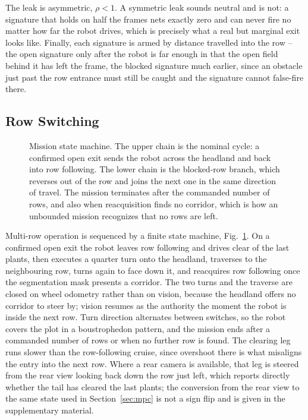 \documentclass[conference]{IEEEtran}
\begin{document}
The leak is asymmetric, $\rho < 1$. A symmetric leak sounds neutral and is not:
a signature that holds on half the frames nets exactly zero and can never fire
no matter how far the robot drives, which is precisely what a real but marginal
exit looks like. Finally, each signature is armed by distance travelled into
the row -- the open signature only after the robot is far enough in that the
open field behind it has left the frame, the blocked signature much earlier,
since an obstacle just past the row entrance must still be caught and the
signature cannot false-fire there.

\subsection{Row Switching}
\label{sec:switching}

\begin{figure}[t]
\centering

\caption{Mission state machine. The upper chain is the nominal cycle: a
confirmed open exit sends the robot across the headland and back into row
following. The lower chain is the blocked-row branch, which reverses out of the
row and joins the next one in the same direction of travel. The mission
terminates after the commanded number of rows, and also when reacquisition
finds no corridor, which is how an unbounded mission recognizes that no rows
are left.}
\label{fig:fsm}
\end{figure}

Multi-row operation is sequenced by a finite state machine, Fig.~\ref{fig:fsm}.
On a confirmed open
exit the robot leaves row following and drives clear of the last plants, then
executes a quarter turn onto the headland, traverses to the neighbouring row,
turns again to face down it, and reacquires row following once the segmentation
mask presents a corridor. The two turns and the traverse are closed on wheel
odometry rather than on vision, because the headland offers no corridor to
steer by; vision resumes as the authority the moment the robot is inside the
next row. Turn direction alternates between switches, so the robot covers the
plot in a boustrophedon pattern, and the mission ends after a commanded number
of rows or when no further row is found. The clearing leg runs slower than the
row-following cruise, since overshoot there is what misaligns the entry into
the next row. Where a rear camera is available, that leg is steered from the
rear view looking back down the row just left, which reports directly whether
the tail has cleared the last plants; the conversion from the rear view to the
same state used in Section~\ref{sec:mpc} is not a sign flip and is given in the
supplementary material.
\end{document}
